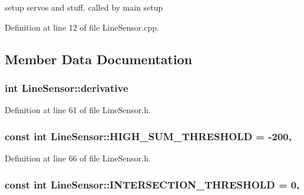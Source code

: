 setup servos and stuff. called by main setup 



Definition at line 12 of file Line\-Sensor.\-cpp.



\subsection{Member Data Documentation}
\hypertarget{classLineSensor_aa5bd7119b2332eab8b6c850f8fa3d558}{
\subsubsection[{derivative}]{\setlength{\rightskip}{0pt plus 5cm}int Line\-Sensor\-::derivative\hspace{0.3cm}{\ttfamily [private]}}}\label{classLineSensor_aa5bd7119b2332eab8b6c850f8fa3d558}


Definition at line 61 of file Line\-Sensor.\-h.

\hypertarget{classLineSensor_a3e7f65abc054f54cb74f8aa3eb552e89}{
\subsubsection[{H\-I\-G\-H\-\_\-\-S\-U\-M\-\_\-\-T\-H\-R\-E\-S\-H\-O\-L\-D}]{\setlength{\rightskip}{0pt plus 5cm}const int Line\-Sensor\-::\-H\-I\-G\-H\-\_\-\-S\-U\-M\-\_\-\-T\-H\-R\-E\-S\-H\-O\-L\-D = -\/200\hspace{0.3cm}{\ttfamily [static]}, {\ttfamily [private]}}}\label{classLineSensor_a3e7f65abc054f54cb74f8aa3eb552e89}


Definition at line 66 of file Line\-Sensor.\-h.

\hypertarget{classLineSensor_a55b9f63bd4c01990f6f2d7baa830d2ec}{
\subsubsection[{I\-N\-T\-E\-R\-S\-E\-C\-T\-I\-O\-N\-\_\-\-T\-H\-R\-E\-S\-H\-O\-L\-D}]{\setlength{\rightskip}{0pt plus 5cm}const int Line\-Sensor\-::\-I\-N\-T\-E\-R\-S\-E\-C\-T\-I\-O\-N\-\_\-\-T\-H\-R\-E\-S\-H\-O\-L\-D = 0\hspace{0.3cm}{\ttfamily [static]}, {\ttfamily [private]}}}\label{classLineSensor_a55b9f63bd4c01990f6f2d7baa830d2ec}



